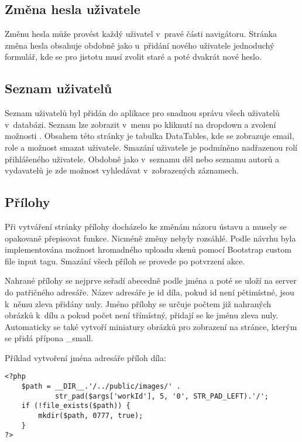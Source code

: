         \subsection{Změna hesla uživatele}
            Změnu hesla může provést každý uživatel v~pravé části navigátoru. Stránka změna hesla obsahuje obdobně jako u~přidání nového uživatele jednoduchý formulář, kde se pro jistotu musí zvolit staré a poté dvakrát nové heslo.
            
        \subsection{Seznam uživatelů}
            Seznam uživatelů byl přidán do aplikace pro snadnou správu všech uživatelů v~databázi. Seznam lze zobrazit v~menu po kliknutí na dropdown a zvolení možnosti . Obsahem této stránky je tabulka DataTables, kde se zobrazuje email, role a možnost smazat uživatele. Smazání uživatele je podmíněno nadřazenou rolí přihlášeného uživatele. Obdobně jako v~seznamu děl nebo seznamu autorů a vydavatelů je zde možnost vyhledávat v~zobrazených záznamech.
        
        \subsection{Přílohy}
            Při vytváření stránky přílohy docházelo ke změnám názoru ústavu a musely se opakovaně přepisovat funkce. Nicméně změny nebyly rozsáhlé. Podle návrhu byla implementována možnost hromadného uploadu skenů pomocí Bootstrap custom file input tagu. Smazání všech příloh se provede po potvrzení akce.
            
            Nahrané přílohy se nejprve seřadí abecedně podle jména a poté se uloží na server do patřičného adresáře. Název adresáře je id díla, pokud id není pětimístné, jsou k~němu zleva přidány nuly. Jméno přílohy se určuje počtem již nahraných obrázků k~dílu a pokud počet není třímístný, přidají se ke jménu zleva nuly. Automaticky se také vytvoří miniatury obrázků pro zobrazení na stránce, kterým se přidá přípona \_small.
            
            Příklad vytvoření jména adresáře příloh díla:
            \pagebreak
            \begin{verbatim}
<?php
    $path = __DIR__.'/../public/images/' .
            str_pad($args['workId'], 5, '0', STR_PAD_LEFT).'/';
    if (!file_exists($path)) {
        mkdir($path, 0777, true);
    }
?>
            \end{verbatim}
            
